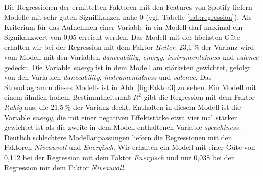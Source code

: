 Die Regressionen der ermittelten Faktoren mit den Features von Spotify liefern Modelle mit sehr guten Signifikanzen nahe 0 (vgl. Tabelle \ref{tab:regression}).
Als Kriterium für das Aufnehmen einer Variable in ein Modell darf maximal ein Signikanzwert von 0,05 erreicht werden.  
Das Modell mit der höchsten Güte erhalten wir bei der Regression mit dem Faktor \textit{Heiter}.
23,1\,\% der Varianz wird vom Modell mit den Variablen \textit{danceability}, \textit{energy}, \textit{instrumentalness} und \textit{valence} gedeckt.
Die Variable \textit{energy} ist in dem Modell am stärksten gewichtet, gefolgt von den Variablen \textit{danceability},  \textit{instrumentalness} und \textit{valence}.
Das Streudiagramm dieses Modells ist in Abb. \ref{fig:Faktor3} zu sehen.    
Ein Modell mit einem ähnlich hohem Bestimmtheitsmaß $R^2$ gibt die Regression mit dem Faktor \textit{Ruhig} aus, die 21,5\,\% der Varianz deckt.
Enthalten in diesem Modell ist die Variable \textit{energy}, die mit einer negativen Effektstärke etwa vier mal stärker gewichtet ist als die zweite in dem Modell enthaltenen Variable \textit{speechiness}.
Deutlich schlechtere Modellanpassungen liefern die Regressionen mit den Faktoren \textit{Niveauvoll} und \textit{Energisch}.
Wir erhalten ein Modell mit einer Güte von 0,112 bei der Regression mit dem Faktor \textit{Energisch} und nur 0,038 bei der Regression mit dem Faktor \textit{Niveauvoll}.

